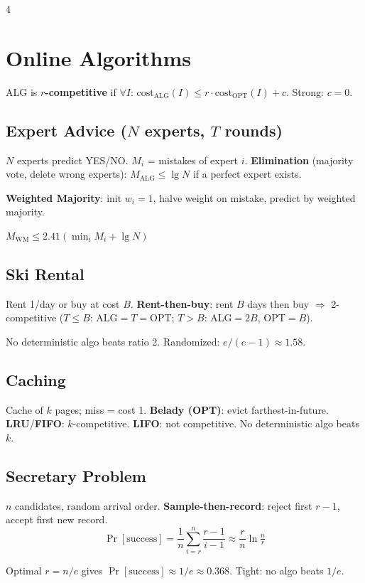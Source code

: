 \documentclass[8pt,a4paper,landscape]{extarticle}
\begin{document}
\begin{multicols*}{4}
\section{Online Algorithms}

\begin{defn}[title=Competitive Ratio]
ALG is \textbf{$r$-competitive} if $\forall I$: $\text{cost}_\text{ALG}(I) \leq r \cdot \text{cost}_\text{OPT}(I) + c$. Strong: $c=0$.
\end{defn}

\subsection{Expert Advice ($N$ experts, $T$ rounds)}
$N$ experts predict YES/NO. $M_i$ = mistakes of expert $i$. \textbf{Elimination} (majority vote, delete wrong experts): $M_\text{ALG} \leq \lg N$ if a perfect expert exists.

\textbf{Weighted Majority}: init $w_i=1$, halve weight on mistake, predict by weighted majority.
\begin{thm}
$M_\text{WM} \leq 2.41(\min_i M_i + \lg N)$
\end{thm}

\subsection{Ski Rental}
Rent 1/day or buy at cost $B$. \textbf{Rent-then-buy}: rent $B$ days then buy $\Rightarrow$ 2-competitive ($T\leq B$: ALG$=T=$OPT; $T>B$: ALG$=2B$, OPT$=B$).
\begin{thm}
No deterministic algo beats ratio 2. Randomized: $e/(e{-}1)\approx1.58$.
\end{thm}

\subsection{Caching}
Cache of $k$ pages; miss = cost 1. \textbf{Belady (OPT)}: evict farthest-in-future. \textbf{LRU}/\textbf{FIFO}: $k$-competitive. \textbf{LIFO}: not competitive. No deterministic algo beats $k$.

\subsection{Secretary Problem}
$n$ candidates, random arrival order. \textbf{Sample-then-record}: reject first $r{-}1$, accept first new record.
\[ \Pr[\text{success}] = \frac{1}{n}\sum_{i=r}^{n}\frac{r-1}{i-1} \approx \frac{r}{n}\ln\!\tfrac{n}{r} \]
\begin{thm}
Optimal $r=n/e$ gives $\Pr[\text{success}]\approx 1/e\approx 0.368$. Tight: no algo beats $1/e$.
\end{thm}


\end{multicols*}
\end{document}
